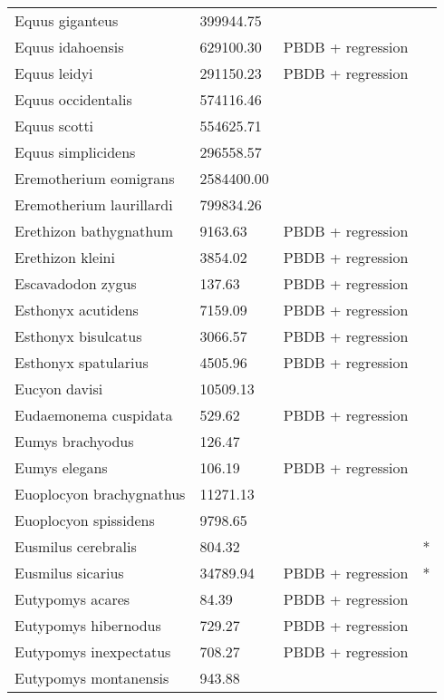 \documentclass{article}
\begin{document}
\begin{center}
\begin{longtable}{p{} p{} p{} p{}}
    Equus giganteus & 399944.75 & \cite{Smith2004} &  \\ 
    Equus idahoensis & 629100.30 & PBDB + regression &  \\ 
    Equus leidyi & 291150.23 & PBDB + regression &  \\ 
    Equus occidentalis & 574116.46 & \cite{Smith2004} &  \\ 
    Equus scotti & 554625.71 & \cite{Smith2004} &  \\ 
    Equus simplicidens & 296558.57 & \cite{Tomiya2013} &  \\ 
    Eremotherium eomigrans & 2584400.00 & \cite{McDonald2005} &  \\ 
    Eremotherium laurillardi & 799834.26 & \cite{Smith2004} &  \\ 
    Erethizon bathygnathum & 9163.63 & PBDB + regression &  \\ 
    Erethizon kleini & 3854.02 & PBDB + regression &  \\ 
    Escavadodon zygus & 137.63 & PBDB + regression &  \\ 
    Esthonyx acutidens & 7159.09 & PBDB + regression &  \\ 
    Esthonyx bisulcatus & 3066.57 & PBDB + regression &  \\ 
    Esthonyx spatularius & 4505.96 & PBDB + regression &  \\ 
    Eucyon davisi & 10509.13 & \cite{Tomiya2013} &  \\ 
    Eudaemonema cuspidata & 529.62 & PBDB + regression &  \\ 
    Eumys brachyodus & 126.47 & \cite{Tomiya2013} &  \\ 
    Eumys elegans & 106.19 & PBDB + regression &  \\ 
    Euoplocyon brachygnathus & 11271.13 & \cite{Tomiya2013} &  \\ 
    Euoplocyon spissidens & 9798.65 & \cite{Tomiya2013} &  \\ 
    Eusmilus cerebralis & 804.32 & \cite{Tomiya2013} & * \\ 
    Eusmilus sicarius & 34789.94 & PBDB + regression & * \\ 
    Eutypomys acares & 84.39 & PBDB + regression &  \\ 
    Eutypomys hibernodus & 729.27 & PBDB + regression &  \\ 
    Eutypomys inexpectatus & 708.27 & PBDB + regression &  \\ 
    Eutypomys montanensis & 943.88 & \cite{Tomiya2013} &  \\ 

\end{longtable}
\end{center}
\end{document}
